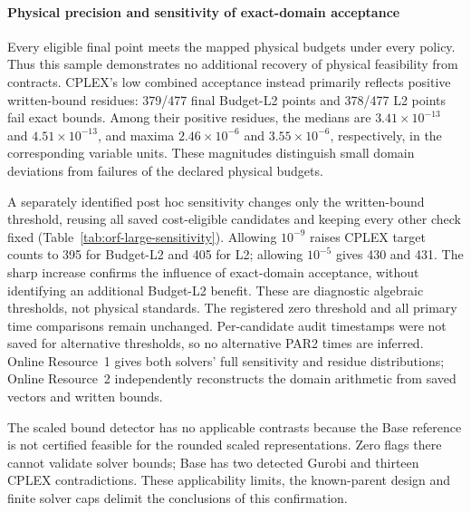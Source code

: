 \paragraph{Physical precision and sensitivity of exact-domain acceptance}
Every eligible final point meets the mapped physical budgets under every
policy. Thus this sample demonstrates no additional recovery of physical
feasibility from contracts. CPLEX's low combined acceptance instead primarily
reflects positive written-bound residues: 379/477 final Budget-L2 points and
378/477 L2 points fail exact bounds. Among their positive residues, the medians
are $3.41\times10^{-13}$ and $4.51\times10^{-13}$, and maxima
$2.46\times10^{-6}$ and $3.55\times10^{-6}$, respectively, in the corresponding
variable units. These magnitudes distinguish small domain deviations from
failures of the declared physical budgets.

A separately identified post hoc sensitivity changes only the written-bound
threshold, reusing all saved cost-eligible candidates and keeping every other
check fixed (Table~\ref{tab:orf-large-sensitivity}). Allowing $10^{-9}$ raises
CPLEX target counts to 395 for Budget-L2 and 405 for L2; allowing $10^{-5}$ gives
430 and 431. The sharp increase confirms the influence of exact-domain
acceptance, without identifying an additional Budget-L2 benefit. These are
diagnostic algebraic thresholds, not physical standards. The registered zero
threshold and all primary time comparisons remain unchanged. Per-candidate
audit timestamps were not saved for alternative thresholds, so no alternative
PAR2 times are inferred. Online Resource~1 gives both solvers' full sensitivity
and residue distributions; Online Resource~2 independently reconstructs the
domain arithmetic from saved vectors and written bounds.


The scaled bound detector has no applicable contrasts because the Base
reference is not certified feasible for the rounded scaled representations.
Zero flags there cannot validate solver bounds; Base has two detected Gurobi
and thirteen CPLEX contradictions. These applicability limits, the known-parent
design and finite solver caps delimit the conclusions of this confirmation.

